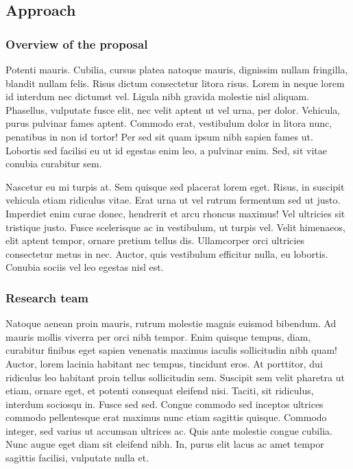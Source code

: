 \documentclass[11pt,]{article}
\begin{document}
\hypertarget{approach}{%
\subsection{Approach}\label{approach}}

\hypertarget{overview-of-the-proposal}{%
\subsubsection{Overview of the
proposal}\label{overview-of-the-proposal}}

Potenti mauris. Cubilia, cursus platea natoque mauris, dignissim nullam
fringilla, blandit nullam felis. Risus dictum consectetur litora risus.
Lorem in neque lorem id interdum nec dictumst vel. Ligula nibh gravida
molestie nisl aliquam. Phasellus, vulputate fusce elit, nec velit aptent
ut vel urna, per dolor. Vehicula, purus pulvinar fames aptent. Commodo
erat, vestibulum dolor in litora nunc, penatibus in non id tortor! Per
sed sit quam ipsum nibh sapien fames ut. Lobortis sed facilisi eu ut id
egestas enim leo, a pulvinar enim. Sed, sit vitae conubia curabitur sem.

Nascetur eu mi turpis at. Sem quisque sed placerat lorem eget. Risus, in
suscipit vehicula etiam ridiculus vitae. Erat urna ut vel rutrum
fermentum sed ut justo. Imperdiet enim curae donec, hendrerit et arcu
rhoncus maximus! Vel ultricies sit tristique justo. Fusce scelerisque ac
in vestibulum, ut turpis vel. Velit himenaeos, elit aptent tempor,
ornare pretium tellus dis. Ullamcorper orci ultricies consectetur metus
in nec. Auctor, quis vestibulum efficitur nulla, eu lobortis. Conubia
sociis vel leo egestas nisl est.

\hypertarget{research-team}{%
\subsubsection{Research team}\label{research-team}}

Natoque aenean proin mauris, rutrum molestie magnis euismod bibendum. Ad
mauris mollis viverra per orci nibh tempor. Enim quisque tempus, diam,
curabitur finibus eget sapien venenatis maximus iaculis sollicitudin
nibh quam! Auctor, lorem lacinia habitant nec tempus, tincidunt eros. At
porttitor, dui ridiculus leo habitant proin tellus sollicitudin sem.
Suscipit sem velit pharetra ut etiam, ornare eget, et potenti consequat
eleifend nisi. Taciti, sit ridiculus, interdum sociosqu in. Fusce sed
sed. Congue commodo sed inceptos ultrices commodo pellentesque erat
maximus nunc etiam sagittis quisque. Commodo integer, sed varius ut
accumsan ultrices ac. Quis ante molestie congue cubilia. Nunc augue eget
diam sit eleifend nibh. In, purus elit lacus ac amet tempor sagittis
facilisi, vulputate nulla et.
\end{document}
